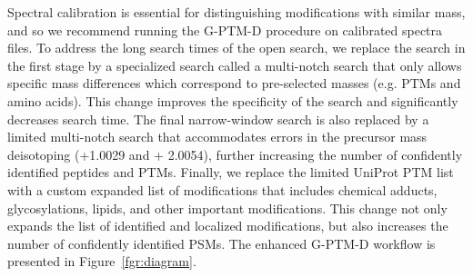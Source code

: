 \documentclass[journal=jprobs,manuscript=article]{achemso}
\begin{document}
Spectral calibration is essential for distinguishing modifications with similar mass, and so we recommend running the G-PTM-D procedure on calibrated spectra files.
To address the long search times of the open search, we replace the search in the first stage by a specialized search called a multi-notch search that only allows specific mass differences which correspond to pre-selected masses (e.g. PTMs and amino acids).
This change improves the specificity of the search and significantly decreases search time.
The final narrow-window search is also replaced by a limited multi-notch search that accommodates errors in the precursor mass deisotoping (+1.0029 and + 2.0054), further increasing the number of confidently identified peptides and PTMs.
Finally, we replace the limited UniProt PTM list with a custom expanded list of modifications that includes chemical adducts, glycosylations, lipids, and other important modifications.
This change not only expands the list of identified and localized modifications, but also increases the number of confidently identified PSMs.
The enhanced G-PTM-D workflow is presented in Figure~\ref{fgr:diagram}.
\end{document}
